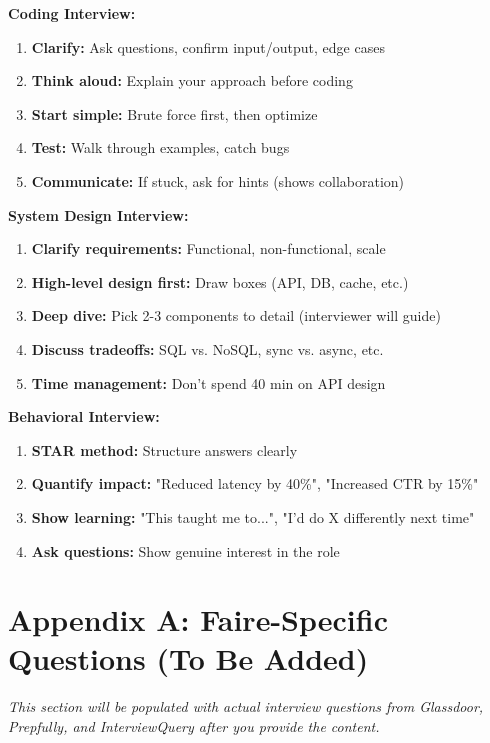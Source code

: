 \documentclass[11pt,letterpaper]{article}
\begin{document}
\textbf{Coding Interview:}
\begin{enumerate}
    \item \textbf{Clarify:} Ask questions, confirm input/output, edge cases
    \item \textbf{Think aloud:} Explain your approach before coding
    \item \textbf{Start simple:} Brute force first, then optimize
    \item \textbf{Test:} Walk through examples, catch bugs
    \item \textbf{Communicate:} If stuck, ask for hints (shows collaboration)
\end{enumerate}

\textbf{System Design Interview:}
\begin{enumerate}
    \item \textbf{Clarify requirements:} Functional, non-functional, scale
    \item \textbf{High-level design first:} Draw boxes (API, DB, cache, etc.)
    \item \textbf{Deep dive:} Pick 2-3 components to detail (interviewer will guide)
    \item \textbf{Discuss tradeoffs:} SQL vs. NoSQL, sync vs. async, etc.
    \item \textbf{Time management:} Don't spend 40 min on API design
\end{enumerate}

\textbf{Behavioral Interview:}
\begin{enumerate}
    \item \textbf{STAR method:} Structure answers clearly
    \item \textbf{Quantify impact:} "Reduced latency by 40\%", "Increased CTR by 15\%"
    \item \textbf{Show learning:} "This taught me to...", "I'd do X differently next time"
    \item \textbf{Ask questions:} Show genuine interest in the role
\end{enumerate}

\section{Appendix A: Faire-Specific Questions (To Be Added)}

\textit{This section will be populated with actual interview questions from Glassdoor, Prepfully, and InterviewQuery after you provide the content.}
\end{document}
